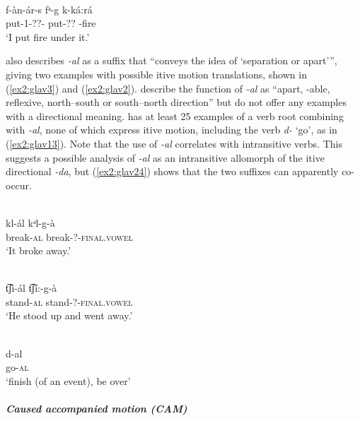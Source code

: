 \ea\label{ex2:glav8}
 \\
\gll f-àn-ár-s	fᵊ-g	k-ká:rá \\
put-1-??-	put-??	-fire \\
\glt `I put fire under it.'
\z

\citet[25]{nghagyiyaSketchGlavdaGrammar2011} also describes \textit{-al} as a suffix that ``conveys the idea of `separation or apart'{''}, giving two examples with possible itive motion translations, shown in (\ref{ex2:glav3}) and (\ref{ex2:glav2}). \citet{bubaGlavdaMorphology2007} describe the function of \textit{-al} as ``apart, -able, reflexive, north–south or south–north direction'' but do not offer any examples with a directional meaning. \citet{owensGlavdaRuralUrban2011} has at least 25 examples of a verb root combining with \textit{-al}, none of which express itive motion, including the verb \textit{d-} `go', as in (\ref{ex2:glav13}). Note that the use of \textit{-al} correlates with intransitive verbs. This suggests a possible analysis of \textit{-al} as an intransitive allomorph of the itive directional \textit{-da}, but (\ref{ex2:glav24}) shows that the two suffixes can apparently co-occur.

\ea\label{ex2:glav3}
 \\
\gll kl-ál	kᵊl-g-à \\
break-\textsc{al}	break-?-\textsc{final.vowel}	 \\
\glt `It broke away.'

\ex\label{ex2:glav2}
 \\
\gll t͡ʃì-ál	t͡ʃí:-g-à \\
stand-\textsc{al}	stand-?-\textsc{final.vowel} \\
\glt `He stood up and went away.'

\ex\label{ex2:glav13}
 \\
\gll d-al \\
go-\textsc{al} \\
\glt `finish (of an event), be over'
\z 

\subparagraph{Caused accompanied motion (CAM)}

